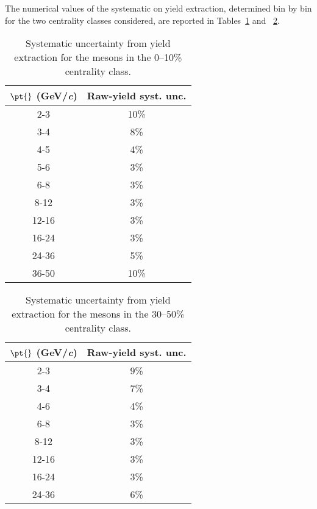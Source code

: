 The numerical values of the systematic on yield extraction, determined bin by bin for the two centrality classes considered, 
are reported in Tables~\ref{tab:DsYieldSyst010_ml} and ~\ref{tab:DsYieldSyst3050_ml}.
\begin{table}[htbp]
  \begin{center}
   \begin{tabular}{|c|c|}
    \hline
    \textbf{$\mathbf{\pt{}}$ (GeV/\textit{c})} & \textbf{Raw-yield syst. unc.} \\
    \hline
    2-3 & 10\%\\
    \hline
    3-4 & 8\%\\
    \hline
    4-5 & 4\%\\
    \hline
    5-6 & 3\%\\
    \hline
    6-8 & 3\%\\
    \hline
    8-12 & 3\%\\
    \hline
    12-16 & 3\%\\
    \hline
    16-24 & 3\%\\
    \hline
    24-36 & 5\%\\
    \hline
    36-50 & 10\%\\ 
    \hline
   \end{tabular}
  \end{center}
  \caption{Systematic uncertainty from yield extraction for the \Dsubs{} mesons in the 0--10\% centrality class.}
  \label{tab:DsYieldSyst010_ml}
\end{table}
\begin{table}[htbp]
  \begin{center}
   \begin{tabular}{|c|c|}
    \hline
    \textbf{$\mathbf{\pt{}}$ (GeV/\textit{c})} & \textbf{Raw-yield syst. unc.} \\
    \hline
    2-3 & 9\%\\
    \hline
    3-4 & 7\%\\
    \hline
    4-6 & 4\%\\
    \hline
    6-8 & 3\%\\
    \hline
    8-12 & 3\%\\
    \hline
    12-16 & 3\%\\
    \hline
    16-24 & 3\%\\
    \hline
    24-36 & 6\%\\
    \hline
   \end{tabular}
  \end{center}
  \caption{Systematic uncertainty from yield extraction for the \Dsubs{} mesons in the 30--50\% centrality class.}
  \label{tab:DsYieldSyst3050_ml}
\end{table} 


